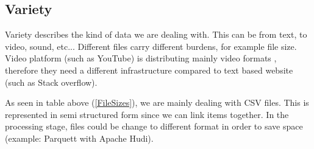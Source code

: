 \subsection{Variety}\label{Variety}

Variety describes the kind of data we are dealing with. This can be from text, to video, sound, etc... Different files carry different burdens, for example file size. Video platform (such as YouTube) is distributing mainly video formats \parencite{hota2018big}, therefore they need a different infrastructure compared to text based website (such as Stack overflow).

As seen in table above (\ref{FileSizes}), we are mainly dealing with CSV files. This is represented in semi structured form since we can link items together. In the processing stage, files could be change to different format in order to save space (example: Parquett with Apache Hudi).